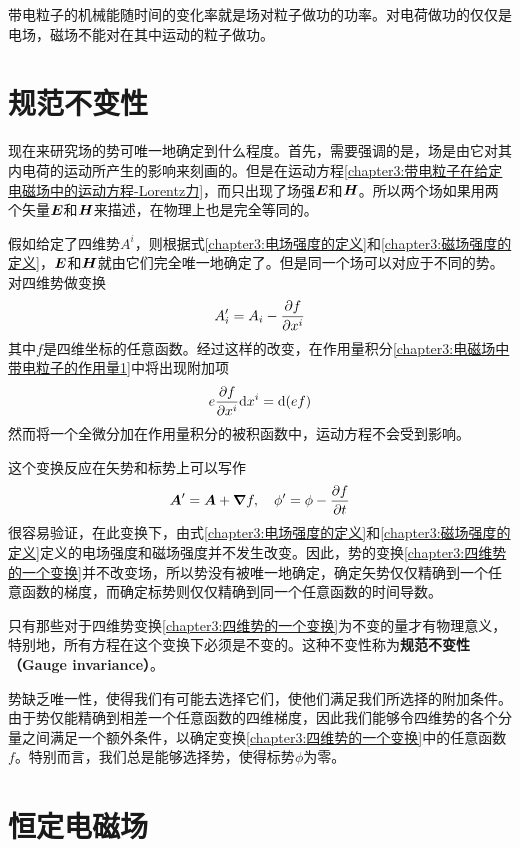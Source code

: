 带电粒子的机械能随时间的变化率就是场对粒子做功的功率。对电荷做功的仅仅是电场，磁场不能对在其中运动的粒子做功。

\section{规范不变性}

现在来研究场的势可唯一地确定到什么程度。首先，需要强调的是，场是由它对其内电荷的运动所产生的影响来刻画的。但是在运动方程\eqref{chapter3:带电粒子在给定电磁场中的运动方程-Lorentz力}，而只出现了场强$\boldsymbol{E}$和$\boldsymbol{H}$。所以两个场如果用两个矢量$\boldsymbol{E}$和$\boldsymbol{H}$来描述，在物理上也是完全等同的。

假如给定了四维势$A^i$，则根据式\eqref{chapter3:电场强度的定义}和\eqref{chapter3:磁场强度的定义}，$\boldsymbol{E}$和$\boldsymbol{H}$就由它们完全唯一地确定了。但是同一个场可以对应于不同的势。对四维势做变换
\begin{equation}
	A'_i = A_i-\frac{\partial f}{\partial x^i}
	\label{chapter3:四维势的一个变换}
\end{equation}
其中$f$是四维坐标的任意函数。经过这样的改变，在作用量积分\eqref{chapter3:电磁场中带电粒子的作用量1}中将出现附加项
\begin{equation}
	e\frac{\partial f}{\partial x^i}\mathrm{d} x^i = \mathrm{d} (ef)
\end{equation}
然而将一个全微分加在作用量积分的被积函数中，运动方程不会受到影响。

这个变换反应在矢势和标势上可以写作
\begin{equation}
	\boldsymbol{A}'=\boldsymbol{A} + \boldsymbol{\nabla} f,\quad \phi' = \phi-\frac{\partial f}{\partial t}
\end{equation}
很容易验证，在此变换下，由式\eqref{chapter3:电场强度的定义}和\eqref{chapter3:磁场强度的定义}定义的电场强度和磁场强度并不发生改变。因此，势的变换\eqref{chapter3:四维势的一个变换}并不改变场，所以势没有被唯一地确定，确定矢势仅仅精确到一个任意函数的梯度，而确定标势则仅仅精确到同一个任意函数的时间导数。

只有那些对于四维势变换\eqref{chapter3:四维势的一个变换}为不变的量才有物理意义，特别地，所有方程在这个变换下必须是不变的。这种不变性称为{\bf 规范不变性（Gauge invariance）}。

势缺乏唯一性，使得我们有可能去选择它们，使他们满足我们所选择的附加条件。由于势仅能精确到相差一个任意函数的四维梯度，因此我们能够令四维势的各个分量之间满足一个额外条件，以确定变换\eqref{chapter3:四维势的一个变换}中的任意函数$f$。特别而言，我们总是能够选择势，使得标势$\phi$为零。

\section{恒定电磁场}


